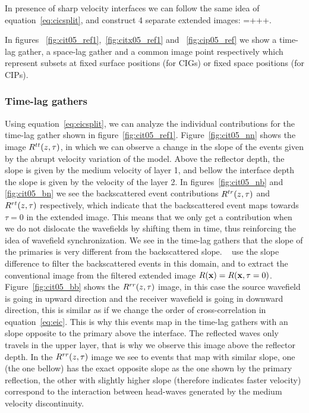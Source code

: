 In presence of sharp velocity interfaces we can follow the same idea of equation~\ref{eq:cicsplit}, and construct 4 separate 
extended images:
\beq
\Re=+++.
\label{eq:eicsplit}
\eeq

In figures ~\ref{fig:cit05_ref1},~\ref{fig:citx05_ref1} and ~\ref{fig:cip05_ref} we show a time-lag gather, a space-lag gather
 and a common image point respectively which represent subsets at fixed surface positions (for CIGs) or fixed space positions 
(for CIPs).


\subsubsection{Time-lag gathers}

Using equation~\ref{eq:eicsplit}, we can analyze the individual contributions
for the time-lag gather shown in figure~\ref{fig:cit05_ref1}. Figure~\ref{fig:cit05_nn} shows the image $R^{tt}(z,\tau)$,
in which we can observe a change in the slope of the events given by the abrupt velocity variation of the model. 
%
Above the reflector depth, the slope is given by the medium velocity of layer 1, and bellow the interface depth the slope is given
 by the velocity of the layer 2. In figures~\ref{fig:cit05_nb} and \ref{fig:cit05_bn} we see the backscattered
 event contributions $R^{tr}(z,\tau)$ and $R^{rt}(z,\tau)$ respectively, which indicate that the backscattered event maps towards $\tau=0$
in the extended image. This means that we only get a contribution when we do not dislocate the wavefields by shifting them in time, 
thus reinforcing the idea of wavefield synchronization. We see in the time-lag gathers that the slope of the primaries is very different
from the backscattered slope. ~\cite{kaelin:3125} use the slope difference to filter the backscattered 
events in this domain, and to extract the conventional image from the filtered extended image $R({\bf x})=R({\bf x},\tau=0)$. 
%
%
Figure~\ref{fig:cit05_bb} shows the $R^{rr}(z,\tau)$ image, in this case the source wavefield is going in upward
direction and the receiver wavefield is going in downward direction, this is similar as if we change the order of cross-correlation in
equation~\ref{eq:eic}. This is why this events map in the time-lag gathers with an slope opposite to the primary above the
interface. The reflected waves only travels in the upper layer, that is why we observe this image above the reflector depth. In the $R^{rr}(z,\tau)$
image we see to events that map with similar slope, one (the one bellow) has the exact opposite slope as the one shown by the primary reflection,
the other with slightly higher slope (therefore indicates faster velocity) correspond to the interaction between head-waves generated by 
the medium velocity discontinuity.

